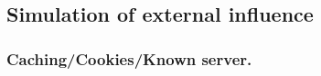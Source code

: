 \documentclass[runningheads]{llncs}
\begin{document}








\subsection{Simulation of external influence}\label{Sec:ExtInfls}

\subsubsection*{Caching/Cookies/Known server.}
\end{document}
